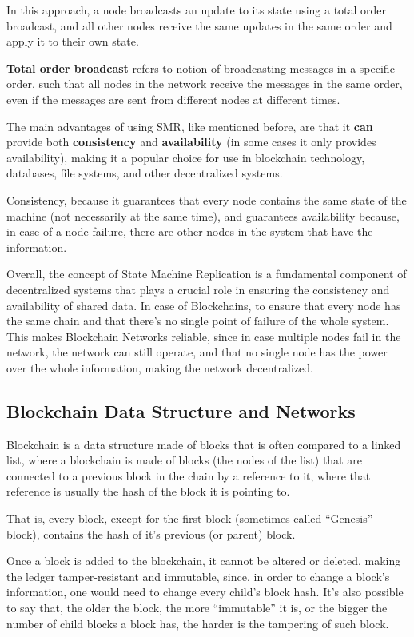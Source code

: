 In this approach, a node broadcasts an update to its state using a total order broadcast, and all other nodes receive the same updates in the same order and apply it to their own state.

\textbf{Total order broadcast} refers to notion of broadcasting messages in a specific order, such that all nodes in the network receive the messages in the same order, even if the messages are sent from different nodes at different times.

The main advantages of using SMR, like mentioned before, are that it \textbf{can} provide both \textbf{consistency} and \textbf{availability} (in some cases it only provides availability), making it a popular choice for use in blockchain technology, databases, file systems, and other decentralized systems.

Consistency, because it guarantees that every node contains the same state of the machine (not necessarily at the same time), and guarantees availability because, in case of a node failure, there are other nodes in the system that have the information.

Overall, the concept of State Machine Replication is a fundamental component of decentralized systems that plays a crucial role in ensuring the consistency and availability of shared data. In case of Blockchains, to ensure that every node has the same chain and that there's no single point of failure of the whole system. This makes Blockchain Networks reliable, since in case multiple nodes fail in the network, the network can still operate, and that no single node has the power over the whole information, making the network decentralized. 


\subsection*{\textbf{Blockchain Data Structure and Networks}}
Blockchain is a data structure made of blocks that is often compared to a linked list, where a blockchain is made of blocks (the nodes of the list) that are connected to a previous block in the chain by a reference to it, where that reference is usually the hash of the block it is pointing to.

That is, every block, except for the first block (sometimes called ``Genesis'' block), contains the hash of it's previous (or parent) block.

Once a block is added to the blockchain, it cannot be altered or deleted, making the ledger tamper-resistant and immutable, since, in order to change a block's information, one would need to change every child's block hash.
It's also possible to say that, the older the block, the more ``immutable'' it is, or the bigger the number of child blocks a block has, the harder is the tampering of such block.


